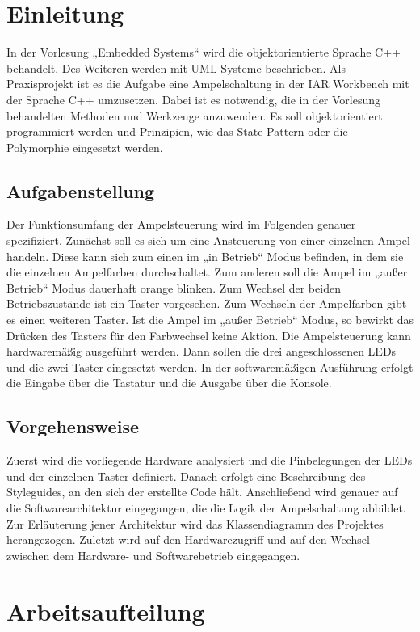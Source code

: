 \chapter{Einleitung}
In der Vorlesung „Embedded Systems“ wird die objektorientierte Sprache C++ behandelt. Des Weiteren werden mit UML Systeme beschrieben. Als Praxisprojekt ist es die Aufgabe eine Ampelschaltung in der IAR Workbench mit der Sprache C++ umzusetzen. Dabei ist es notwendig, die in der Vorlesung behandelten Methoden und Werkzeuge anzuwenden. Es soll objektorientiert programmiert werden und Prinzipien, wie das State Pattern oder die Polymorphie eingesetzt werden.

\section{Aufgabenstellung}
Der Funktionsumfang der Ampelsteuerung wird im Folgenden genauer spezifiziert. Zunächst soll es sich um eine Ansteuerung von einer einzelnen Ampel handeln. Diese kann sich zum einen im „in Betrieb“ Modus befinden, in dem sie die einzelnen Ampelfarben durchschaltet. Zum anderen soll die Ampel im „außer Betrieb“ Modus dauerhaft orange blinken. Zum Wechsel der beiden Betriebszustände ist ein Taster vorgesehen. Zum Wechseln der Ampelfarben gibt es einen weiteren Taster. Ist die Ampel im „außer Betrieb“ Modus, so bewirkt das Drücken des Tasters für den Farbwechsel keine Aktion. Die Ampelsteuerung kann hardwaremäßig ausgeführt werden. Dann sollen die drei angeschlossenen LEDs und die zwei Taster eingesetzt werden. In der softwaremäßigen Ausführung erfolgt die Eingabe über die Tastatur und die Ausgabe über die Konsole.

\section{Vorgehensweise}

Zuerst wird die vorliegende Hardware analysiert und die Pinbelegungen der LEDs und der einzelnen Taster definiert. Danach erfolgt eine Beschreibung des Styleguides, an den sich der erstellte Code hält. Anschließend wird genauer auf die Softwarearchitektur eingegangen, die die Logik der Ampelschaltung abbildet. Zur Erläuterung jener Architektur wird das Klassendiagramm des Projektes herangezogen. Zuletzt wird auf den Hardwarezugriff und auf den Wechsel zwischen dem Hardware- und Softwarebetrieb eingegangen.

\chapter{Arbeitsaufteilung}

